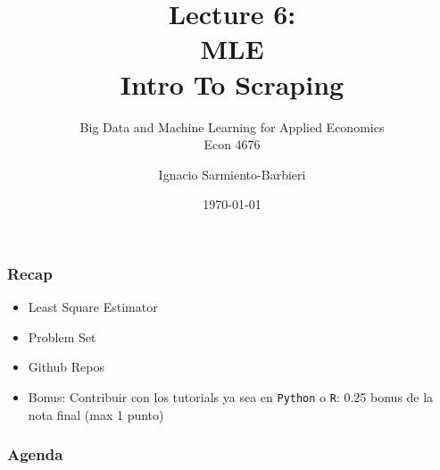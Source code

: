 \documentclass[
  shownotes,
  xcolor={svgnames},
  hyperref={colorlinks,citecolor=DarkBlue,linkcolor=DarkRed,urlcolor=DarkBlue}
  , aspectratio=169]{beamer}
\begin{document}
\title[Lecture 6]{Lecture 6: \\ MLE \\ Intro To Scraping}
\subtitle{Big Data and Machine Learning for Applied Economics \\ Econ 4676}
\date{\today}

\author[Sarmiento-Barbieri]{Ignacio Sarmiento-Barbieri}


\begin{frame}[noframenumbering]
\maketitle
\end{frame}




\begin{frame}
\frametitle{Recap}

\begin{itemize} 
  
    \item Least Square Estimator
    \medskip
    \item Problem Set    
    \medskip
    \item Github Repos
    \medskip
    \item Bonus: Contribuir con los tutorials ya sea en  \texttt{Python}  o \texttt{R}:  0.25 bonus de la nota final (max 1 punto)

\end{itemize}

\end{frame}


\begin{frame}
\frametitle{Agenda}

\tableofcontents


\end{frame}



\end{document}

